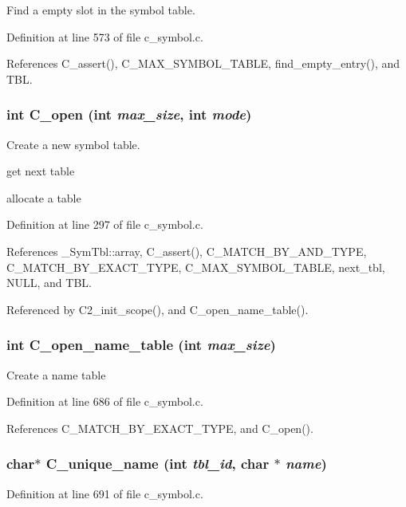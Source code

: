 Find a empty slot in the symbol table. 

Definition at line 573 of file c\_\-symbol.c.

References C\_\-assert(), C\_\-MAX\_\-SYMBOL\_\-TABLE, find\_\-empty\_\-entry(), and TBL.
\subsubsection{\setlength{\rightskip}{0pt plus 5cm}int C\_\-open (int {\em max\_\-size}, int {\em mode})}\label{c__symbol_8c_9e31694a4ba6f29b591504e7442671af}


Create a new symbol table. 

get next table

allocate a table 

Definition at line 297 of file c\_\-symbol.c.

References \_\-Sym\-Tbl::array, C\_\-assert(), C\_\-MATCH\_\-BY\_\-AND\_\-TYPE, C\_\-MATCH\_\-BY\_\-EXACT\_\-TYPE, C\_\-MAX\_\-SYMBOL\_\-TABLE, next\_\-tbl, NULL, and TBL.

Referenced by C2\_\-init\_\-scope(), and C\_\-open\_\-name\_\-table().
\subsubsection{\setlength{\rightskip}{0pt plus 5cm}int C\_\-open\_\-name\_\-table (int {\em max\_\-size})}\label{c__symbol_8c_72acbcb8e0206c293a730449e97a2e9e}


Create a name table 

Definition at line 686 of file c\_\-symbol.c.

References C\_\-MATCH\_\-BY\_\-EXACT\_\-TYPE, and C\_\-open().
\subsubsection{\setlength{\rightskip}{0pt plus 5cm}char$\ast$ C\_\-unique\_\-name (int {\em tbl\_\-id}, char $\ast$ {\em name})}\label{c__symbol_8c_040c25b4616d473be8eff35b29ea1982}




Definition at line 691 of file c\_\-symbol.c.

